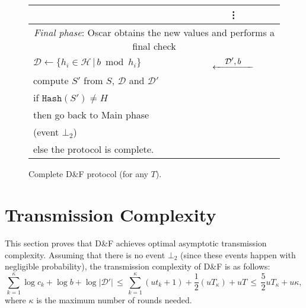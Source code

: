 \documentclass[twoside,envcountsame,runningheads]{llncs}
\newcommand{\Set}{\mathcal{H}}
\newcommand{\SetD}{\mathcal{D}}
\newcommand{\df}{D\&F\xspace}
\newcommand{\Hash}{\ensuremath{\mathtt{Hash}}}
\newcommand{\Lflow}[1]{\stackrel{\displaystyle #1}{\hbox to 5em{\leftarrowfill}}}
\newcommand{\apref}[1]{Appendix~\ref{#1}}
\newcommand{\apref}[1]{the full version~\cite{X:ABBMNR13}}
\begin{document}
\begin{figure}[t]
\begin{tabular}{p{}cp{}}
 & \vdots & \\
\midrule
\multicolumn{3}{c}{\textit{Final phase}: Oscar obtains the new values and performs a final check } \\
\midrule
$\SetD \gets \{ h_i \in \Set \,|\, b \bmod h_i \}$ & $\Lflow{\SetD',b}$  & \\
compute $S'$ from $S$, $\SetD$ and $\SetD'$ & & \\
if $\Hash(S') \neq H$ & & \\
\hspace{0.2cm} then go back to Main phase && \\
\hspace{0.4cm} (event $\bot_2$) & & \\
\hspace{0.2cm} else the protocol is complete. & & \\
\bottomrule
\end{tabular}\vspace{-0.25cm} %
\caption{Complete \df protocol (for any $T$).}
\label{fig:complete-df}
\end{figure}


\section{Transmission Complexity}
\label{sec:trans}

This section proves that \df achieves optimal asymptotic transmission complexity.%
%
%
Assuming that there is no event $\bot_2$ (since these events happen with negligible probability), the transmission complexity of \df is as follows:
\[  \sum_{k=1}^\kappa \log c_k + \log b + \log |\SetD'|
 \,\leq\, \sum_{k=1}^\kappa (ut_k+1) + \frac{1}{2} (uT_\kappa) + u T
 \,\leq\, \frac{5}{2} u T_\kappa + u \kappa, \]
where $\kappa$ is the maximum number of rounds needed.
\end{document}
